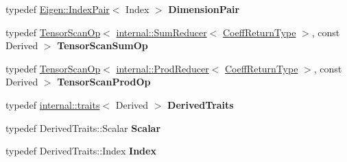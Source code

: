 \begin{DoxyCompactItemize}
typedef \hyperlink{struct_eigen_1_1_index_pair}{Eigen\+::\+Index\+Pair}$<$ Index $>$ {\bfseries Dimension\+Pair}
\item 
\mbox{\label{class_eigen_1_1_tensor_base_3_01_derived_00_01_read_only_accessors_01_4_a4a5580f3a3fe12f172ab97fdc267ec18}} 
typedef \hyperlink{class_eigen_1_1_tensor_scan_op}{Tensor\+Scan\+Op}$<$ \hyperlink{struct_eigen_1_1internal_1_1_sum_reducer}{internal\+::\+Sum\+Reducer}$<$ \hyperlink{group___sparse_core___module}{Coeff\+Return\+Type} $>$, const Derived $>$ {\bfseries Tensor\+Scan\+Sum\+Op}
\item 
\mbox{\label{class_eigen_1_1_tensor_base_3_01_derived_00_01_read_only_accessors_01_4_a3642e0305d8771a6c582afae66a959f6}} 
typedef \hyperlink{class_eigen_1_1_tensor_scan_op}{Tensor\+Scan\+Op}$<$ \hyperlink{struct_eigen_1_1internal_1_1_prod_reducer}{internal\+::\+Prod\+Reducer}$<$ \hyperlink{group___sparse_core___module}{Coeff\+Return\+Type} $>$, const Derived $>$ {\bfseries Tensor\+Scan\+Prod\+Op}
\item 
\mbox{\label{class_eigen_1_1_tensor_base_3_01_derived_00_01_read_only_accessors_01_4_a292a4dd3e8e0c195973868c239458d60}} 
typedef \hyperlink{struct_eigen_1_1internal_1_1traits}{internal\+::traits}$<$ Derived $>$ {\bfseries Derived\+Traits}
\item 
\mbox{\label{class_eigen_1_1_tensor_base_3_01_derived_00_01_read_only_accessors_01_4_a520c9879a53ac886a6f4b7f7914bffcd}} 
typedef Derived\+Traits\+::\+Scalar {\bfseries Scalar}
\item 
\mbox{\label{class_eigen_1_1_tensor_base_3_01_derived_00_01_read_only_accessors_01_4_a37fa2d34e33136cf733faa6820b22907}} 
typedef Derived\+Traits\+::\+Index {\bfseries Index}
\item 
\mbox{\label{class_eigen_1_1_tensor_base_3_01_derived_00_01_read_only_accessors_01_4_a7742e4e20415b2f9e8a564f3994e44c6}} 

\end{DoxyCompactItemize}
